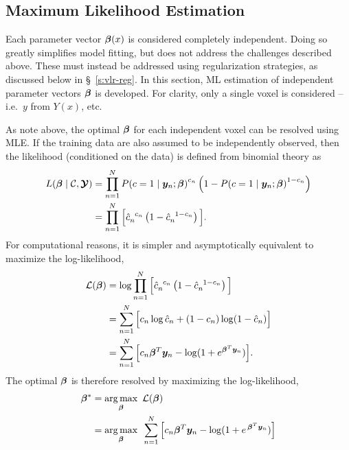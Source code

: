 \subsection{Maximum Likelihood Estimation}
Each parameter vector $\bm{\beta}(x)$ is considered completely independent.
Doing so greatly simplifies model fitting, but does not address the challenges described above.
These must instead be addressed using regularization strategies,
as discussed below in \S~\ref{s:vlr-reg}.
In this section, ML estimation of independent parameter vectors $\bm{\beta}$ is developed.
For clarity, only a single voxel is considered -- i.e.\ $y$ from $Y(x)$, etc.
\par
As note above, the optimal $\bm{\beta}$ for each independent voxel can be resolved using MLE.
If the training data are also assumed to be independently observed,
then the likelihood (conditioned on the data) is defined from binomial theory as
\begin{align}
  L(\bb\mid\C,\bY) &= \prod_{n=1}^{N} {P(c=1\mid\by_n;\bb)}^{c_n}
                              \left(1-{P(c=1\mid\by_n;\bb)}^{1-c_n}\right)\nonumber\\
                   &= \prod_{n=1}^{N} \Big[\hat{c}_n^{\en c_n}
                                   \left(1-\hat{c}_n^{\en 1-c_n}\right)\Big].%
  \label{eq:likelihood}
\end{align}
For computational reasons,
it is simpler and asymptotically equivalent to maximize the log-likelihood,
\begin{align}
  \L(\bb) &= \log{ \prod_{n=1}^{N} \Big[\hat{c}_n^{\en c_n}
                                \left(1-\hat{c}_n^{\en 1-c_n}\right)\Big] }\nonumber\\
          &= \sum_{n=1}^{N} \Big[ c_n \log \hat{c}_n + (1-c_n) \log (1-\hat{c}_n) \Big] \nonumber\\
          &= \sum_{n=1}^{N} \Big[ c_n \bb^T\by_n - \log (1+e^{\bb^T\by_n}) \Big].%
  \label{eq:loglikelihood}
\end{align}
The optimal $\bm{\beta}$ is therefore resolved by maximizing the log-likelihood,
\begin{align}
  \bb^* &= \underset{\bb}{\arg\max}\en\L(\bb)\nonumber\\
        &= \underset{\bb}{\arg\max}\en\sum_{n=1}^{N}
             \Big[ c_n \bb^T\by_n - \log (1+e^{\et\bb^T\by_n}) \Big]%
  \label{eq:argmaxmle}
\end{align}
